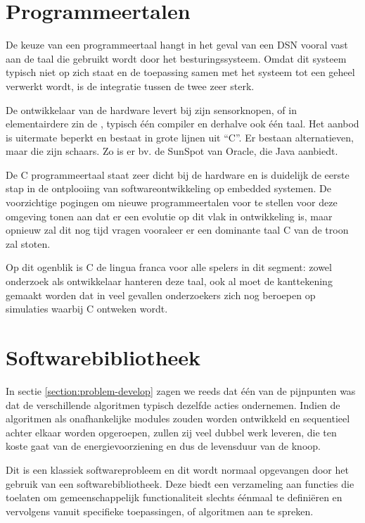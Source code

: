 \vspace{-3mm}

\section{Programmeertalen}
\label{section:solution-proglang}

De keuze van een programmeertaal hangt in het geval van een DSN vooral vast aan
de taal die gebruikt wordt door het besturingssysteem. Omdat dit systeem
typisch niet op zich staat en de toepassing samen met het systeem tot een
geheel verwerkt wordt, is de integratie tussen de twee zeer sterk.

De ontwikkelaar van de hardware levert bij zijn sensorknopen, of in
elementairdere zin de \mcu, typisch \'e\'en compiler en derhalve ook \'e\'en
taal. Het aanbod is uitermate beperkt en bestaat in grote lijnen uit ``C''. Er
bestaan alternatieven, maar die zijn schaars. Zo is er bv. de SunSpot van
Oracle, die Java aanbiedt.

De C programmeertaal staat zeer dicht bij de hardware en is duidelijk de eerste
stap in de ontplooiing van softwareontwikkeling op embedded systemen. De
voorzichtige pogingen om nieuwe programmeertalen voor te stellen voor deze
omgeving tonen aan dat er een evolutie op dit vlak in ontwikkeling is, maar
opnieuw zal dit nog tijd vragen vooraleer er een dominante taal C van de troon
zal stoten.

Op dit ogenblik is C de lingua franca voor alle spelers in dit segment: zowel
onderzoek als ontwikkelaar hanteren deze taal, ook al moet de kanttekening
gemaakt worden dat in veel gevallen onderzoekers zich nog beroepen op
simulaties waarbij C ontweken wordt.

\vspace{-3mm}

\section{Softwarebibliotheek}
\label{section:solution-library}

In sectie \ref{section:problem-develop} zagen we reeds dat \'e\'en van de
pijnpunten was dat de verschillende algoritmen typisch dezelfde acties
ondernemen. Indien de algoritmen als onafhankelijke modules zouden worden
ontwikkeld en sequentieel achter elkaar worden opgeroepen, zullen zij veel
dubbel werk leveren, die ten koste gaat van de energievoorziening en dus de
levensduur van de knoop.

Dit is een klassiek softwareprobleem en dit wordt normaal opgevangen door het
gebruik van een softwarebibliotheek. Deze biedt een verzameling aan functies
die toelaten om gemeenschappelijk functionaliteit slechts \'e\'enmaal te
defini\"eren en vervolgens vanuit specifieke toepassingen, of algoritmen aan te
spreken.

